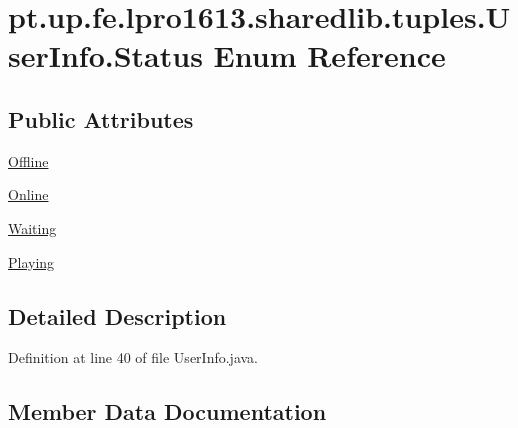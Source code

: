 \hypertarget{enumpt_1_1up_1_1fe_1_1lpro1613_1_1sharedlib_1_1tuples_1_1_user_info_1_1_status}{}\section{pt.\+up.\+fe.\+lpro1613.\+sharedlib.\+tuples.\+User\+Info.\+Status Enum Reference}
\label{enumpt_1_1up_1_1fe_1_1lpro1613_1_1sharedlib_1_1tuples_1_1_user_info_1_1_status}
\subsection*{Public Attributes}
\begin{DoxyCompactItemize}
\item 
\hyperlink{enumpt_1_1up_1_1fe_1_1lpro1613_1_1sharedlib_1_1tuples_1_1_user_info_1_1_status_a631493b767b2aadc3745976cd35071f0}{Offline}
\item 
\hyperlink{enumpt_1_1up_1_1fe_1_1lpro1613_1_1sharedlib_1_1tuples_1_1_user_info_1_1_status_ab067f60ed9db74fcad27270d75df00c1}{Online}
\item 
\hyperlink{enumpt_1_1up_1_1fe_1_1lpro1613_1_1sharedlib_1_1tuples_1_1_user_info_1_1_status_a0137735cbcd9b5f797e37408bf500cde}{Waiting}
\item 
\hyperlink{enumpt_1_1up_1_1fe_1_1lpro1613_1_1sharedlib_1_1tuples_1_1_user_info_1_1_status_a64e1320707271e980af216630588aab5}{Playing}
\end{DoxyCompactItemize}


\subsection{Detailed Description}


Definition at line 40 of file User\+Info.\+java.



\subsection{Member Data Documentation}
\hypertarget{enumpt_1_1up_1_1fe_1_1lpro1613_1_1sharedlib_1_1tuples_1_1_user_info_1_1_status_a631493b767b2aadc3745976cd35071f0}{}\label{enumpt_1_1up_1_1fe_1_1lpro1613_1_1sharedlib_1_1tuples_1_1_user_info_1_1_status_a631493b767b2aadc3745976cd35071f0} 
